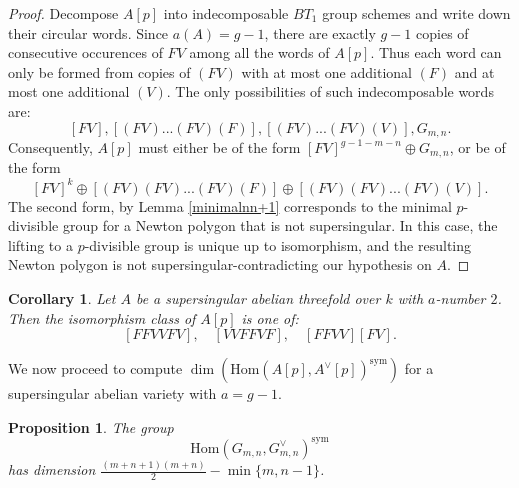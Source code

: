 \documentclass[a4paper,12pt,twoside]{report}
\newtheorem{proposition}[theorem]{Proposition}
\newtheorem{corollary}[theorem]{Corollary}
\newcommand{\Hom}{\mathrm{Hom}}
\newcommand{\sym}{\mathrm{sym}}
\begin{document}
\begin{proof}
    Decompose $A[p]$ into indecomposable $BT_1$ group schemes and write down their circular words. 
    Since $a(A)=g-1$, there are exactly $g-1$ copies of consecutive occurences of 
    $FV$ among all the words of $A[p]$. 
    Thus each word can only be formed from copies of $(FV)$ with at most one additional $(F)$ and at most one additional $(V)$. 
    The only possibilities of such indecomposable words are: 
    \[[FV], [(FV)...(FV)(F)], [(FV)...(FV)(V)], G_{m,n}.\]
    Consequently, $A[p]$ must either be of the form $[FV]^{g-1-m-n}\oplus G_{m,n}$, 
    or be of the form \[[FV]^k\oplus[(FV)(FV)...(FV)(F)]\oplus[(FV)(FV)...(FV)(V)].\] 
    The second form, by Lemma \ref{minimalnn+1} corresponds to the minimal $p$-divisible group for a Newton polygon that is not supersingular.
    In this case, the lifting to a $p$-divisible group is unique up to isomorphism, and the resulting Newton polygon is not supersingular-contradicting our hypothesis on $A$. 
\end{proof} 

\begin{corollary}\label{Abe3g=2}
    Let $A$ be a supersingular abelian threefold over $k$ with $a$-number $2$. 
    Then the isomorphism class of $A[p]$ is one of: 
    \[[FFVVFV],\quad [VVFFVF],\quad [FFVV][FV].\] 
\end{corollary}

We now proceed to compute $\dim(\Hom(A[p],A^\vee[p])^{\sym})$ for a supersingular abelian variety with $a=g-1$. 

\begin{proposition}\label{HomGmnsym}
    The group \[\Hom(G_{m,n},G_{m,n}^\vee)^\sym\] has dimension $\frac{(m+n+1)(m+n)}{2}-\min\{m,n-1\}$.
\end{proposition}
\end{document}
